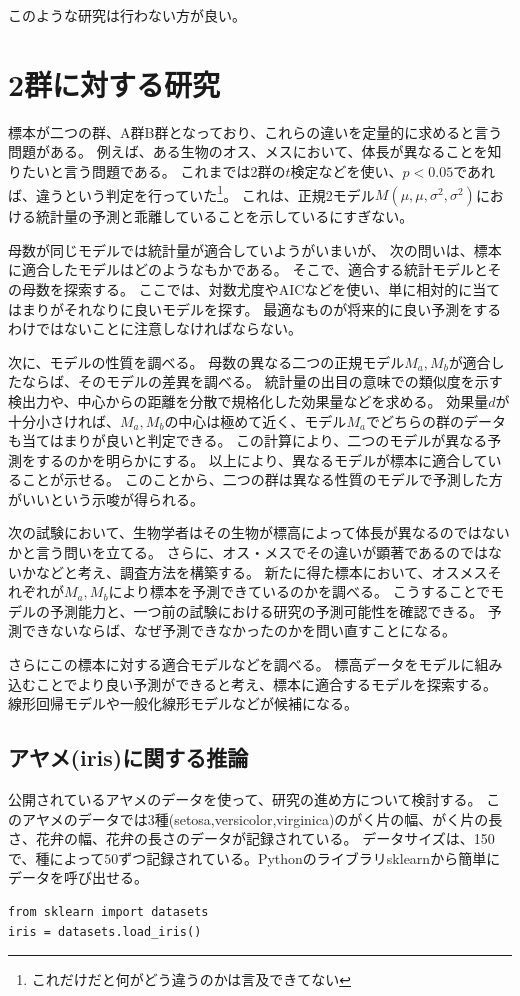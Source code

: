 このような研究は行わない方が良い。


\section{2群に対する研究}
標本が二つの群、A群B群となっており、これらの違いを定量的に求めると言う問題がある。
例えば、ある生物のオス、メスにおいて、体長が異なることを知りたいと言う問題である。
これまでは2群の$t$検定などを使い、$p<0.05$であれば、違うという判定を行っていた\footnote{これだけだと何がどう違うのかは言及できてない}。
これは、正規2モデル$M(\mu,\mu,\sigma^2,\sigma^2)$における統計量の予測と乖離していることを示しているにすぎない。

母数が同じモデルでは統計量が適合していようがいまいが、
次の問いは、標本に適合したモデルはどのようなもかである。
そこで、適合する統計モデルとその母数を探索する。
ここでは、対数尤度やAICなどを使い、単に相対的に当てはまりがそれなりに良いモデルを探す。
最適なものが将来的に良い予測をするわけではないことに注意しなければならない。

次に、モデルの性質を調べる。
母数の異なる二つの正規モデル$M_a,M_b$が適合したならば、そのモデルの差異を調べる。
統計量の出目の意味での類似度を示す検出力や、中心からの距離を分散で規格化した効果量などを求める。
効果量$d$が十分小さければ、$M_a,M_b$の中心は極めて近く、モデル$M_a$でどちらの群のデータも当てはまりが良いと判定できる。
この計算により、二つのモデルが異なる予測をするのかを明らかにする。
以上により、異なるモデルが標本に適合していることが示せる。
このことから、二つの群は異なる性質のモデルで予測した方がいいという示唆が得られる。

次の試験において、生物学者はその生物が標高によって体長が異なるのではないかと言う問いを立てる。
さらに、オス・メスでその違いが顕著であるのではないかなどと考え、調査方法を構築する。
新たに得た標本において、オスメスそれぞれが$M_a,M_b$により標本を予測できているのかを調べる。
こうすることでモデルの予測能力と、一つ前の試験における研究の予測可能性を確認できる。
予測できないならば、なぜ予測できなかったのかを問い直すことになる。

さらにこの標本に対する適合モデルなどを調べる。
標高データをモデルに組み込むことでより良い予測ができると考え、標本に適合するモデルを探索する。
線形回帰モデルや一般化線形モデルなどが候補になる。


\subsection{アヤメ(iris)に関する推論}
公開されているアヤメのデータを使って、研究の進め方について検討する。
このアヤメのデータでは$3$種(setosa,versicolor,virginica)のがく片の幅、がく片の長さ、花弁の幅、花弁の長さのデータが記録されている。
データサイズは、150で、種によって$50$ずつ記録されている。Pythonのライブラリsklearnから簡単にデータを呼び出せる。
\begin{lstlisting}
from sklearn import datasets
iris = datasets.load_iris()
\end{lstlisting}

